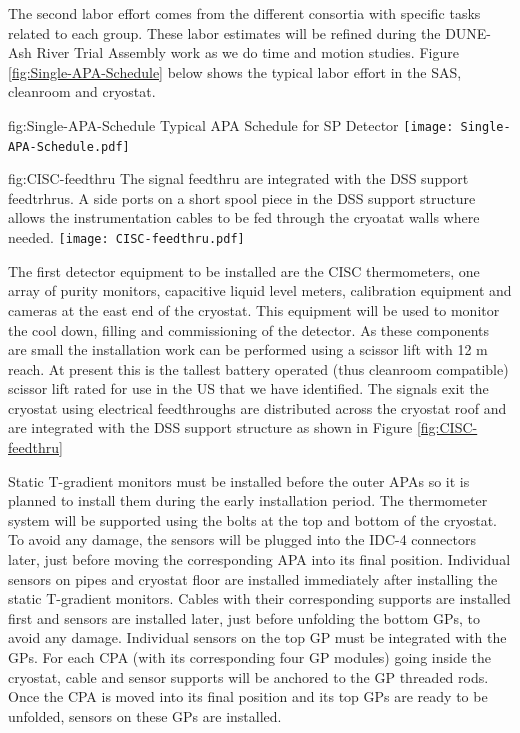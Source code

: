 The second labor effort comes from the different consortia with specific tasks related to each group. These labor estimates will be refined during the DUNE-Ash River Trial Assembly work as we do time and motion studies. Figure \ref{fig:Single-APA-Schedule} below shows the typical labor effort in the SAS, cleanroom and cryostat. 

\begin{dunefigure}
{fig:Single-APA-Schedule}
{Typical APA Schedule for SP Detector}
\texttt{[image: Single-APA-Schedule.pdf]}
\end{dunefigure}

\begin{dunefigure}{fig:CISC-feedthru}
{The signal feedthru are integrated with the DSS support feedtrhrus. A side ports on a short spool piece in the DSS support structure allows the instrumentation cables to be fed through the cryoatat walls where needed.}
\texttt{[image: CISC-feedthru.pdf]}
\end{dunefigure}



The first detector equipment to be installed are the CISC thermometers, one array of purity monitors, capacitive liquid level meters, calibration equipment and cameras at the east end of the cryostat. 
This equipment will be used to monitor the cool down, filling and commissioning of the detector. As these components are small the installation work can be performed using a scissor lift with 12 \si{m} reach. 
At present this is the tallest battery operated (thus cleanroom compatible) scissor lift rated for use in the US that we have identified. The signals exit the cryostat using electrical feedthroughs are distributed across the cryostat roof and are integrated with the DSS support structure as shown in Figure \ref{fig:CISC-feedthru}

Static T-gradient monitors must be installed before the outer APAs so it is planned to install them during the early installation period. The thermometer system will be supported using the bolts at the top and bottom of the cryostat. To avoid any damage, the sensors will be plugged into the IDC-4 connectors later, just before moving the corresponding APA into its final position. Individual sensors on pipes and cryostat floor are installed immediately after installing the static T-gradient monitors. Cables with their corresponding supports are installed first and sensors are installed later, just before unfolding the bottom GPs, to avoid any damage. Individual sensors on the top GP must be integrated with the GPs. For each CPA (with its corresponding four GP modules) going inside the cryostat, cable and sensor supports will be anchored to the GP threaded rods. Once the CPA is moved into its final position and its top GPs are ready to be unfolded, sensors on these GPs are installed.

